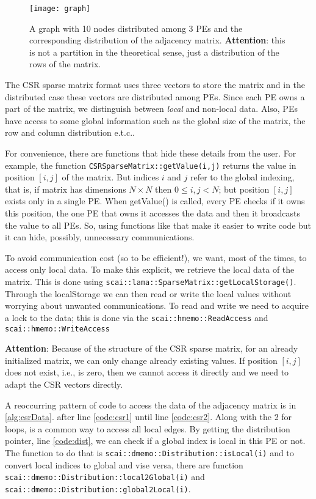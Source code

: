 \documentclass[a4paper,10pt]{article}
\newcommand{\etc}{e.t.c.}
\newcommand{\att}{\textbf{Attention}: }
\newcommand{\MI}[1]{\texttt{#1}}
\begin{document}
\begin{figure}[h]
\centering
\texttt{[image: graph]}
\caption{A graph with 10 nodes distributed among 3 PEs and the corresponding distribution of the 
adjacency matrix. \att this is not a partition in the theoretical sense, just a distribution of
the rows of the matrix.}
\label{fig:graph}
\end{figure}

The CSR sparse matrix format uses three vectors to store the matrix and in the distributed case
these vectors are distributed among PEs. Since each PE owns a part of the matrix,
we distinguish between \emph{local} and non-local data. Also, PEs have access to some global information 
such as the global size of the matrix, the row and column distribution \etc. 

For convenience, there are functions that hide these details from the user.
For example, the function \texttt{CSRSparseMatrix::getValue(i,j)} returns the value 
in position $[i,j]$
of the matrix. But indices $i$ and $j$ refer to the global indexing, that is, if matrix has dimensions
$N\times N$ then $0\leq i,j < N$; but position $[i,j]$ exists only in a single PE. When getValue() is
called, every PE checks if it owns this position, the one PE that owns it accesses the data and 
then it broadcasts the value to all PEs. So, using functions like that make it easier to write code
but it can hide, possibly, unnecessary communications.

To avoid communication cost (so to be efficient!), we want, most of the times, to access only local 
data. To make this explicit, we retrieve the local data of the matrix. 
This is done using \texttt{scai::lama::SparseMatrix::getLocalStorage()}. 
Through the localStorage we can then read or write the local values without worrying about unwanted 
communications. To read and write we need to acquire a lock to the data; this is done via the
\texttt{scai::hmemo::ReadAccess} and \texttt{scai::hmemo::WriteAccess}

\att Because of the structure of the CSR sparse matrix, for an already initialized matrix, we can only 
change already existing values. If position $[i,j]$ does not exist, i.e., is zero, then we cannot 
access it directly and we need to adapt the CSR vectors directly.

A reoccurring pattern of code to access the data of the adjacency matrix is in \cref{alg:csrData}.
after line \ref{code:csr1} until line \ref{code:csr2}. Along with the 2 for loops, is a common way to
access all local edges. 
By getting the distribution pointer, line \ref{code:dist}, we can check if a global index is local 
in this PE or not.
The function to do that is \MI{scai::dmemo::Distribution::isLocal(i)} and to convert local
indices to global and vise versa, there are function
\MI{scai::dmemo::Distribution::local2Global(i)} and \\
\MI{scai::dmemo::Distribution::global2Local(i)}.
\end{document}
